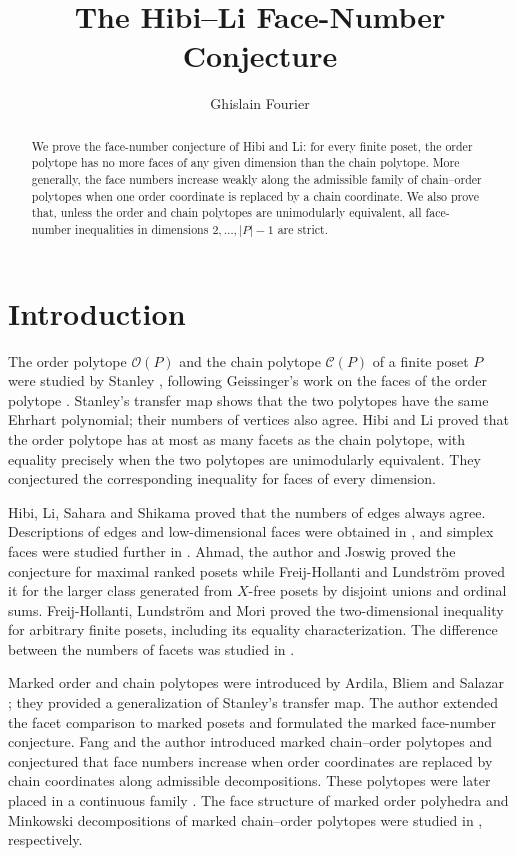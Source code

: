 \documentclass[a4paper,12pt]{amsart}
\title{The Hibi--Li Face-Number Conjecture}
\author{Ghislain Fourier}
\theoremstyle{definition}
\theoremstyle{remark}
\begin{document}
\begin{abstract}
We prove the face-number conjecture of Hibi and Li: for every finite poset, the order polytope has no more faces of any given dimension than the chain polytope.
More generally, the face numbers increase weakly along the admissible family of chain--order polytopes when one order coordinate is replaced by a chain coordinate. 
We also prove that, unless the order and chain polytopes are unimodularly equivalent, all face-number inequalities in dimensions $2,\ldots,|P|-1$ are strict.

\end{abstract}
\maketitle
\section{Introduction}\label{sec1}

The order polytope $\mathcal O(P)$ and the chain polytope $\mathcal C(P)$ of a finite poset $P$ were studied by Stanley \cite{Sta86}, following Geissinger's work on the faces of the order polytope \cite{Gei81}.
Stanley's transfer map shows that the two polytopes have the same Ehrhart polynomial; their numbers of vertices also agree.
Hibi and Li \cite{HL16} proved that the order polytope has at most as many facets as the chain polytope, with equality precisely when the two polytopes are unimodularly equivalent.
They conjectured the corresponding inequality for faces of every dimension.

Hibi, Li, Sahara and Shikama \cite{Hib+17} proved that the numbers of edges always agree.
Descriptions of edges and low-dimensional faces were obtained in \cite{HL19,Mor19}, and simplex faces were studied further in \cite{Mor25a,Mor25b,FL26}.
Ahmad, the author and Joswig \cite{AFJ26} proved the conjecture for maximal ranked posets while Freij-Hollanti and Lundstr\"om \cite{FL24} proved it for the larger class generated from $X$-free posets by disjoint unions and ordinal sums.
Freij-Hollanti, Lundstr\"om and Mori \cite{FLM26} proved the two-dimensional inequality for arbitrary finite posets, including its equality characterization.
The difference between the numbers of facets was studied in \cite{Bha+25,Fou26}.

Marked order and chain polytopes were introduced by Ardila, Bliem and Salazar \cite{ABS11}; they provided a generalization of Stanley's transfer map.
The author \cite{Fou16} extended the facet comparison to marked posets and formulated the marked face-number conjecture.
Fang and the author \cite{FF16} introduced marked chain--order polytopes and conjectured that face numbers increase when order coordinates are replaced by chain coordinates along admissible decompositions.
These polytopes were later placed in a continuous family \cite{Fan+20}.
The face structure of marked order polyhedra and Minkowski decompositions of marked chain--order polytopes were studied in \cite{Peg18,FFP20}, respectively.
\end{document}

